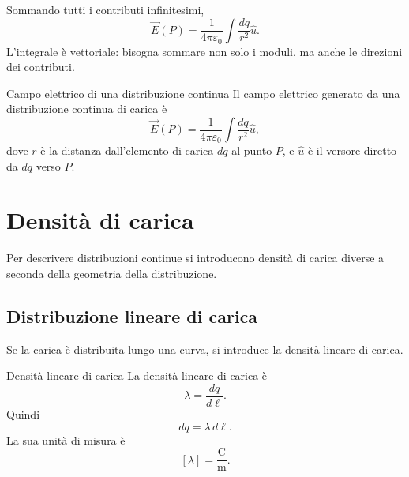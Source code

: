 \documentclass[a4paper]{article}
\begin{document}
Sommando tutti i contributi infinitesimi,
\[
    \vec{E}(P)=\frac{1}{4\pi\varepsilon_0}\int \frac{dq}{r^2}\hat{u}.
\]
L'integrale è vettoriale: bisogna sommare non solo i moduli, ma anche le direzioni dei contributi.

\begin{snippettheorem}{Campo elettrico di una distribuzione continua}
    Il campo elettrico generato da una distribuzione continua di carica è
    \[
        \vec{E}(P)=\frac{1}{4\pi\varepsilon_0}\int \frac{dq}{r^2}\hat{u},
    \]
    dove \(r\) è la distanza dall'elemento di carica \(dq\) al punto \(P\), e \(\hat{u}\) è il versore diretto da \(dq\) verso \(P\).
\end{snippettheorem}

\begin{center}
\end{center}

\section{Densità di carica}

Per descrivere distribuzioni continue si introducono densità di carica diverse a seconda della geometria della distribuzione.

\subsection{Distribuzione lineare di carica}

Se la carica è distribuita lungo una curva, si introduce la densità lineare di carica.

\begin{snippetdefinition}{Densità lineare di carica}
    La densità lineare di carica è
    \[
        \lambda=\frac{dq}{d\ell}.
    \]
    Quindi
    \[
        dq=\lambda\,d\ell.
    \]
    La sua unità di misura è
    \[
        [\lambda]=\frac{\mathrm{C}}{\mathrm{m}}.
    \]
\end{snippetdefinition}
\end{document}
